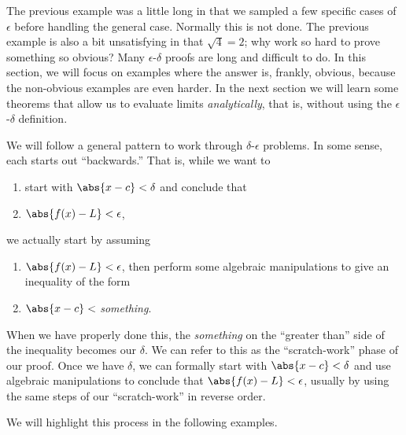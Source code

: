 The previous example was a little long in that we sampled a few specific cases of $\epsilon$ before handling the general case. Normally this is not done.  The previous example is also a bit unsatisfying in that $\sqrt{4}=2$; why work so hard to prove something so obvious? Many $\epsilon$-$\delta$ proofs are long and difficult to do. In this section, we will focus on examples where the answer is, frankly, obvious, because the non-obvious examples are even harder. In the next section we will learn some theorems that allow us to evaluate limits \emph{analytically}, that is, without using the $\epsilon$-$\delta$ definition.

We will follow a general pattern to work through $\delta$-$\epsilon$ problems. In some sense, each starts out ``backwards.'' That is, while we want to
\begin{enumerate}
	\item start with $\abs{x-c}<\delta$ and conclude that
	\item $\abs{f(x)-L}<\epsilon$,
\end{enumerate}
we actually start by assuming 
\begin{enumerate}
	\item $\abs{f(x)-L}<\epsilon$, then perform some algebraic manipulations to give an inequality of the form
	\item $\abs{x-c}<$ \emph{something}.
\end{enumerate} 
When we have properly done this, the \emph{something} on the ``greater than'' side of the inequality becomes our $\delta$. We can refer to this as the ``scratch-work'' phase of our proof. Once we have $\delta$, we can formally start with $\abs{x-c}<\delta$ and use algebraic manipulations to conclude that $\abs{f(x)-L}<\epsilon$, usually by using the same steps of our ``scratch-work'' in reverse order.

We will highlight this process in the following examples.

